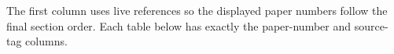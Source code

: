 The first column uses live references so the displayed paper numbers follow
the final section order.  Each table below has exactly the paper-number and
source-tag columns.

\newdimen\crosswalkremaining
\newcommand{\CrosswalkRule}{%
  \noindent\hspace*{.06\textwidth}%
  \rule{.88\textwidth}{.55pt}\par}
\newcommand{\CrosswalkRow}[2]{%
  \noindent\hspace*{.06\textwidth}%
  \begin{minipage}[t]{.58\textwidth}\raggedright\strut #1\strut\end{minipage}%
  \hspace*{.02\textwidth}%
  \begin{minipage}[t]{.28\textwidth}\raggedright\strut #2\strut\end{minipage}\par}
\newcommand{\CrosswalkContinuation}[1]{%
  \par
  \crosswalkremaining=\pagegoal
  \advance\crosswalkremaining by -\pagetotal
  \ifdim\crosswalkremaining<5\baselineskip\newpage\fi
  \noindent\begin{minipage}{\textwidth}\centering
  \textit{Table~\ref*{#1} continued}\par
  \CrosswalkRule
  \CrosswalkRow{\bfseries Paper number}{\bfseries Source tag}
  \CrosswalkRule
  \end{minipage}\par\nobreak}
\newenvironment{crosswalktable}[2]
  {\par\medskip
   \crosswalkremaining=\pagegoal
   \advance\crosswalkremaining by -\pagetotal
   \ifdim\crosswalkremaining<8\baselineskip\newpage\fi
   \begingroup\small
   \noindent\begin{minipage}{\textwidth}\centering
   \captionsetup{hypcap=false}
   \captionof{table}{#1}\label{#2}
   \CrosswalkRule
   \CrosswalkRow{\bfseries Paper number}{\bfseries Source tag}
   \CrosswalkRule
   \end{minipage}\par\nobreak}
  {\nobreak\CrosswalkRule\endgroup\medskip}

